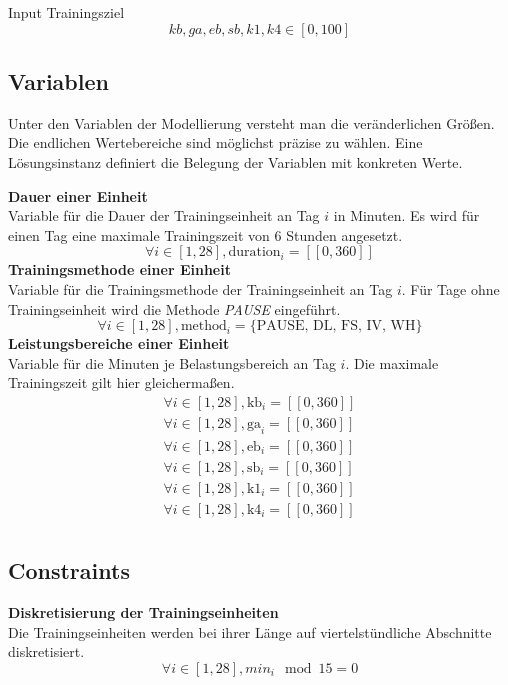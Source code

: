 Input Trainingsziel
\[ kb, ga, eb, sb, k1, k4 \in [0, 100] \]

\subsection{Variablen}
Unter den Variablen der Modellierung versteht man die veränderlichen Größen. Die endlichen Wertebereiche sind möglichst präzise zu wählen. Eine Lösungsinstanz definiert die Belegung der Variablen mit konkreten Werte.

\textbf{Dauer einer Einheit} \\[0.2em]
Variable für die Dauer der Trainingseinheit an Tag $i$ in Minuten. Es wird für einen Tag eine maximale Trainingszeit von 6 Stunden angesetzt.
\begin{equation} 
    \forall i \in [1, 28], \text{duration}_i = [\![0, 360]\!] \end{equation} 
\textbf{Trainingsmethode einer Einheit} \\[0.2em]
Variable für die Trainingsmethode der Trainingseinheit an Tag $i$. Für Tage ohne Trainingseinheit wird die Methode \textit{PAUSE} eingeführt.
\begin{equation} 
    \forall i \in [1, 28], \text{method}_i = \{\text{PAUSE, DL, FS, IV, WH}\}
\end{equation} 
\textbf{Leistungsbereiche einer Einheit} \\[0.2em]
Variable für die Minuten je Belastungsbereich an Tag $i$. Die maximale Trainingszeit gilt hier gleichermaßen.
\begin{equation} 
\begin{array}{c}
    \forall i \in [1, 28], \text{kb}_i = [\![0, 360]\!] \\
    \forall i \in [1, 28], \text{ga}_i = [\![0, 360]\!] \\
    \forall i \in [1, 28], \text{eb}_i = [\![0, 360]\!] \\
    \forall i \in [1, 28], \text{sb}_i = [\![0, 360]\!] \\
    \forall i \in [1, 28], \text{k1}_i = [\![0, 360]\!] \\
    \forall i \in [1, 28], \text{k4}_i = [\![0, 360]\!] \\
\end{array}
\end{equation} 
\subsection{Constraints}
\textbf{Diskretisierung der Trainingseinheiten} \\[0.2em]
Die Trainingseinheiten werden bei ihrer Länge auf viertelstündliche Abschnitte diskretisiert. 
\begin{equation}
    \forall i \in [1, 28], min_i \mod 15 = 0
\end{equation} 

